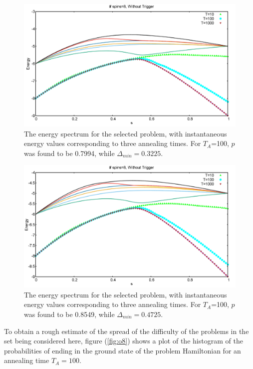 \documentclass[12]{article}
\begin{document}
\begin{figure}[H]
\centering 
\includegraphics[scale=0.3]{79_s8_O.png}
\caption{The energy spectrum for the selected problem, with instantaneous energy values corresponding to three annealing times. For $T_A$=100, $p$ was found to be 0.7994, while $\Delta_{min}=0.3225.$}
\label{fig:o6}
\end{figure}
\begin{figure}[H]
\centering 
\includegraphics[scale=0.3]{59_s8_O.png}
\caption{The energy spectrum for the selected problem, with instantaneous energy values corresponding to three annealing times. For $T_A$=100, $p$ was found to be 0.8549, while $\Delta_{min}=0.4725.$}
\label{fig:o7}
\end{figure}
\newpage
To obtain a rough estimate of the spread of the difficulty of the problems in the set being considered here, figure (\ref{fig:o8}) shows a plot of the histogram of the probabilities of ending in the ground state of the problem Hamiltonian for an annealing time $T_A=100$. 
\end{document}
